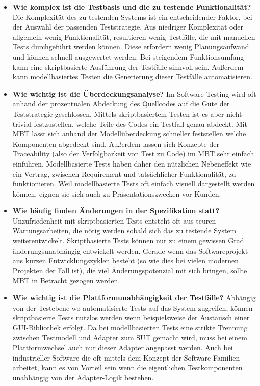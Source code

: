\begin{itemize}
\item \textbf{Wie komplex ist die Testbasis und die zu testende Funktionalität?}
Die Komplexität des zu testenden Systems ist ein entscheidender Faktor, bei der Auswahl der passenden Teststrategie. Aus niedriger Komplexität oder allgemein wenig Funktionalität, resultieren wenig Testfälle, die mit manuellen Tests durchgeführt werden können. Diese erfordern wenig Planungsaufwand und können schnell ausgewertet werden. Bei steigendem Funktionsumfang kann eine skriptbasierte Ausführung der Testfälle sinnvoll sein. Außerdem kann modellbasiertes Testen die Generierung dieser Testfälle automatisieren.
\item \textbf{Wie wichtig ist die Überdeckungsanalyse?}
Im Software-Testing wird oft anhand der prozentualen Abdeckung des Quellcodes auf die Güte der Teststrategie geschlossen. Mittels skriptbasiertem Testen ist es aber nicht trivial festzustellen, welche Teile des Codes ein Testfall genau abdeckt. Mit MBT lässt sich anhand der Modellüberdeckung schneller feststellen welche Komponenten abgedeckt sind. Außerdem lassen sich Konzepte der Traceability (also der Verfolgbarkeit von Test zu Code) im MBT sehr einfach einführen. Modellbasierte Tests haben daher den nützlichen Nebeneffekt wie ein Vertrag, zwischen Requirement und tatsächlicher Funktionalität, zu funktionieren. Weil modellbasierte Tests oft einfach visuell dargestellt werden können, eignen sie sich auch zu Präsentationszwecken vor Kunden.
\item \textbf{Wie häufig finden Änderungen in der Spezifikation statt?} 
Unzufriedenheit mit skriptbasierten Tests entsteht oft aus teuren Wartungsarbeiten, die nötig werden sobald sich das zu testende System weiterentwickelt. Skriptbasierte Tests können nur zu einem gewissen Grad änderungsunabhängig entwickelt werden. Gerade wenn das Softwareprojekt aus kurzen Entwicklungszyklen besteht (so wie dies bei vielen modernen Projekten der Fall ist), die viel Änderungspotenzial mit sich bringen, sollte MBT in Betracht gezogen werden. 
\item \textbf{Wie wichtig ist die Plattformunabhängigkeit der Testfälle?}
Abhängig von der Testebene wo automatisierte Tests auf das System zugreifen, können skriptbasierte Tests nutzlos werden wenn beispielsweise der Austausch einer GUI-Bibliothek erfolgt. Da bei modellbasierten Tests eine strikte Trennung zwischen Testmodell und Adapter zum SUT gemacht wird, muss bei einem Plattformwechsel auch nur dieser Adapter angepasst werden. Auch bei industrieller Software die oft mittels dem Konzept der Software-Familien arbeitet, kann es von Vorteil sein wenn die eigentlichen Testkomponenten unabhängig von der Adapter-Logik bestehen.

\end{itemize}
